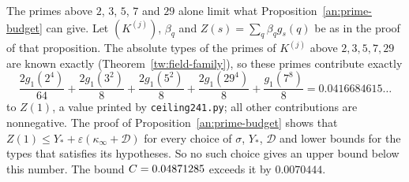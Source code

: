 \begin{remark}\label{an:limit}
The primes above $2$, $3$, $5$, $7$ and $29$ alone limit what
Proposition~\ref{an:prime-budget} can give. Let $(K^{(j)})$, $\beta_q$ and
$Z(s)=\sum_q\beta_qg_s(q)$ be as in the proof of that proposition. The
absolute types of the primes of $K^{(j)}$ above $2,3,5,7,29$ are known exactly
(Theorem~\ref{tw:field-family}), so these primes contribute exactly
\[
 \frac{2g_1(2^4)}{64}+\frac{2g_1(3^2)}8+\frac{2g_1(5^2)}8
 +\frac{2g_1(29^4)}8+\frac{g_1(7^8)}8=0.0416684615\ldots
\]
to $Z(1)$, a value printed by \texttt{ceiling241.py}; all other
contributions are nonnegative. The proof of
Proposition~\ref{an:prime-budget} shows that
$Z(1)\le Y_*+\varepsilon(\kappa_\infty+\mathcal D)$ for every choice of
$\sigma$, $Y_*$, $\mathcal D$ and lower bounds for the types that satisfies
its hypotheses. So no such choice gives an upper bound below this number.
The bound $C=0.04871285$ exceeds it by $0.0070444$.
\end{remark}

